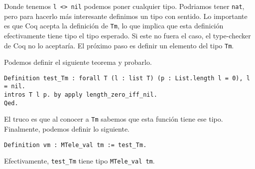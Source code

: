 Donde tenemos \lstinline{l <> nil} podemos poner cualquier tipo.
Podriamos tener \lstinline{nat}, pero para hacerlo más interesante definimos un tipo con sentido.
Lo importante es que Coq acepta la definición de \lstinline{Tm}, lo que implica que esta definición efectivamente tiene tipo el tipo esperado.
Si este no fuera el caso, el type-checker de Coq no lo aceptaría.
El próximo paso es definir un elemento del tipo \lstinline{Tm}.

Podemos definir el siguiente teorema y probarlo.

\begin{lstlisting}
Definition test_Tm : forall T (l : list T) (p : List.length l = 0), l = nil.
intros T l p. by apply length_zero_iff_nil.
Qed.
\end{lstlisting}

El truco es que al conocer a \lstinline{Tm} sabemos que esta función tiene ese tipo.
Finalmente, podemos definir lo siguiente.

\begin{lstlisting}
Definition vm : MTele_val tm := test_Tm.
\end{lstlisting}

Efectivamente, \lstinline{test_Tm} tiene tipo \lstinline{MTele_val tm}.
